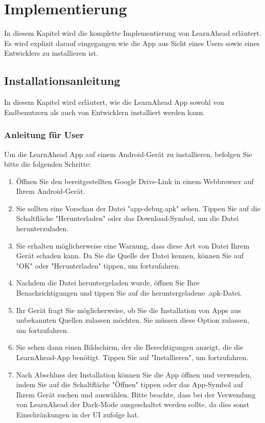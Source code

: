 \section{Implementierung}
In diesem Kapitel wird die komplette Implementierung von LearnAhead erläutert. Es wird explizit darauf eingegangen wie die App aus Sicht eines Users sowie eines Entwicklers zu installieren ist.\newline

\subsection{Installationsanleitung}
In diesem Kapitel wird erläutert, wie die LearnAhead App sowohl von Endbenutzern als auch von Entwicklern installiert werden kann.
\subsubsection{Anleitung für User}
Um die LearnAhead App auf einem Android-Gerät zu installieren, befolgen Sie bitte die folgenden Schritte: \newline

\noindent
\begin{enumerate}
    \item Öffnen Sie den bereitgestellten Google Drive-Link in einem Webbrowser auf Ihrem Android-Gerät.
    \item Sie sollten eine Vorschau der Datei "app-debug.apk" sehen. Tippen Sie auf die Schaltfläche "Herunterladen" oder das Download-Symbol, um die Datei herunterzuladen.
    \item Sie erhalten möglicherweise eine Warnung, dass diese Art von Datei Ihrem Gerät schaden kann. Da Sie die Quelle der Datei kennen, können Sie auf "OK" oder "Herunterladen" tippen, um fortzufahren.
    \item Nachdem die Datei heruntergeladen wurde, öffnen Sie Ihre Benachrichtigungen und tippen Sie auf die heruntergeladene .apk-Datei.
    \item Ihr Gerät fragt Sie möglicherweise, ob Sie die Installation von Apps aus unbekannten Quellen zulassen möchten. Sie müssen diese Option zulassen, um fortzufahren.
    \item Sie sehen dann einen Bildschirm, der die Berechtigungen anzeigt, die die LearnAhead-App benötigt. Tippen Sie auf "Installieren", um fortzufahren.
    \item Nach Abschluss der Installation können Sie die App öffnen und verwenden, indem Sie auf die Schaltfläche "Öffnen" tippen oder das App-Symbol auf Ihrem Gerät suchen und auswählen. Bitte beachte, dass bei der Verwendung von LearnAhead der Dark-Mode ausgeschaltet werden sollte, da dies sonst Einschränkungen in der UI zufolge hat.
\end{enumerate}

